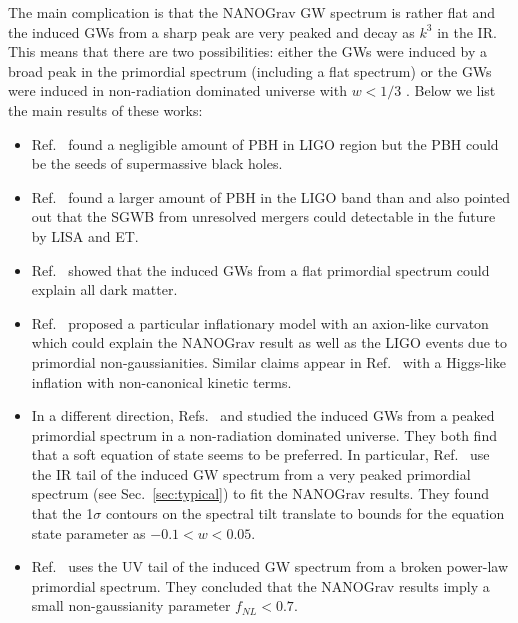 \documentclass[a4paper,11pt]{article}
\numberwithin{equation}{section}
\begin{document}
The main complication is that the NANOGrav GW spectrum is rather flat and the induced GWs from a sharp peak are very peaked and decay as $k^3$ in the IR. This means that there are two possibilities: either the GWs were induced by a broad peak in the primordial spectrum (including a flat spectrum) \cite{Vaskonen:2020lbd,DeLuca:2020agl,Kohri:2020qqd,Bhattacharya:2020lhc,Yi:2021lxc} or the GWs were induced in non-radiation dominated universe with $w<1/3$ \cite{Domenech:2020ers}. Below we list the main results of these works: 
\begin{itemize}
\item[--] Ref.~\cite{Vaskonen:2020lbd} found a negligible amount of PBH in LIGO region but the PBH could be the seeds of supermassive black holes. \item[--] Ref.~\cite{Kohri:2020qqd} found a larger amount of PBH in the LIGO band than \cite{Vaskonen:2020lbd} and also pointed out that the SGWB from unresolved mergers could detectable in the future by LISA and ET. 
\item[--] Ref.~\cite{DeLuca:2020agl} showed that the induced GWs from a flat primordial spectrum could explain all dark matter.
\item[--] Ref.~\cite{Inomata:2020xad} proposed a particular inflationary model with an axion-like curvaton which could explain the NANOGrav result as well as the LIGO events due to primordial non-gaussianities. Similar claims appear in Ref.~\cite{Yi:2021lxc} with a Higgs-like inflation with non-canonical kinetic terms. 
\item[--] In a different direction, Refs.~\cite{Domenech:2020ers} and \cite{Bhattacharya:2020lhc} studied the induced GWs from a peaked primordial spectrum in a non-radiation dominated universe. They both find that a soft equation of state seems to be preferred. In particular, Ref.~\cite{Domenech:2020ers} use the IR tail of the induced GW spectrum from a very peaked primordial spectrum (see Sec.~\ref{sec:typical}) to fit the NANOGrav results. They found that the 1$\sigma$ contours on the spectral tilt translate to bounds for the equation state parameter as $-0.1<w<0.05$. 
\item[--] Ref.~\cite{Atal:2021jyo} uses the UV tail of the induced GW spectrum from a broken power-law primordial spectrum. They concluded that the NANOGrav results imply a small non-gaussianity parameter $f_{NL}<0.7$.
\end{itemize}
\end{document}
